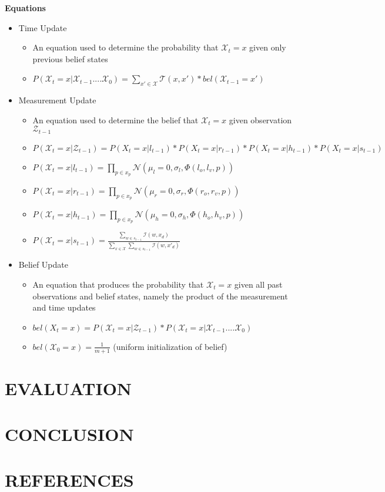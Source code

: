 \documentclass[letterpaper, 10 pt, conference]{ieeeconf}
\begin{document}
\textbf{Equations}
\begin{itemize}
\item{Time Update}
	\begin{itemize}
	\item{An equation used to determine the probability that $\mathcal{X}_t = x$ given only previous belief states}
	\item{$P(\mathcal{X}_t = x | \mathcal{X}_{t-1} .... \mathcal{X}_0) =\displaystyle\sum_{x' \in \mathcal{X}} \mathcal{T}(x, x')*bel(\mathcal{X}_{t-1} = x')$}
	\end{itemize}
\item{Measurement Update}
	\begin{itemize}
	\item{An equation used to determine the belief that $\mathcal{X}_t = x$ given observation $\mathcal{Z}_{t-1}$}
	\item{$P(\mathcal{X}_t=x | \mathcal{Z}_{t-1}) = P(X_t=x | l_{t-1})*P(X_t=x | r_{t-1})*P(X_t=x |h_{t-1})*P(X_t=x | s_{t-1})$}
	\item{$P(\mathcal{X}_t=x|l_{t-1}) = \displaystyle \prod_{p \in x_p} \mathcal{N}(\mu_l=0, \sigma_l, \Phi(l_o,l_v, p))$\\}
	\item{$P(\mathcal{X}_t=x|r_{t-1}) = \displaystyle \prod_{p \in x_p} \mathcal{N}(\mu_r=0, \sigma_r, \Phi(r_o,r_v, p))$\\}
	\item{$P(\mathcal{X}_t=x|h_{t-1}) = \displaystyle \prod_{p \in x_p} \mathcal{N}(\mu_h=0, \sigma_h, \Phi(h_o,h_v, p))$\\}
	\item{$P(\mathcal{X}_t=x|s_{t-1}) = \frac{\displaystyle\sum_{w\in s_{t-1}} \mathcal{I}(w, x_d)}{\displaystyle\sum_{x \in \mathcal{X}}\sum_{w\in s_{t-1}} \mathcal{I}(w, x'_d)}$}
	\end{itemize}
\item{Belief Update}
	\begin{itemize}
	\item{An equation that produces the probability that $\mathcal{X}_t = x$ given all past observations and belief states, namely the product of the measurement and time updates}
	\item{$bel(X_t = x) = P(\mathcal{X}_t=x | \mathcal{Z}_{t-1})*P(\mathcal{X}_t = x | \mathcal{X}_{t-1} .... \mathcal{X}_0)$}
	\item{$bel(\mathcal{X}_0 = x) =  \frac{1}{m+1}$ (uniform initialization of belief)}
	\end{itemize}
\end{itemize}

\section{EVALUATION}

\section{CONCLUSION}

\section{REFERENCES}


\end{document}
